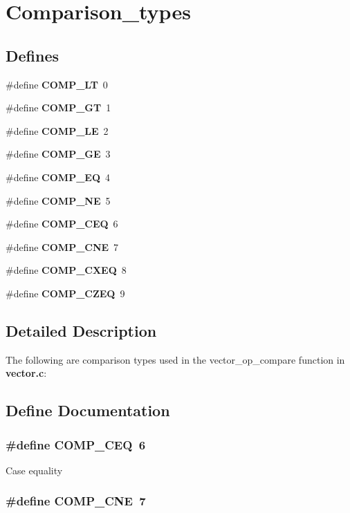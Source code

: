 \section{Comparison\_\-types}
\label{group__comparison__types}
\subsection*{Defines}
\begin{CompactItemize}
\item 
\#define {\bf COMP\_\-LT}\ 0
\item 
\#define {\bf COMP\_\-GT}\ 1
\item 
\#define {\bf COMP\_\-LE}\ 2
\item 
\#define {\bf COMP\_\-GE}\ 3
\item 
\#define {\bf COMP\_\-EQ}\ 4
\item 
\#define {\bf COMP\_\-NE}\ 5
\item 
\#define {\bf COMP\_\-CEQ}\ 6
\item 
\#define {\bf COMP\_\-CNE}\ 7
\item 
\#define {\bf COMP\_\-CXEQ}\ 8
\item 
\#define {\bf COMP\_\-CZEQ}\ 9
\end{CompactItemize}


\subsection{Detailed Description}
The following are comparison types used in the vector\_\-op\_\-compare function in {\bf vector.c}: 

\subsection{Define Documentation}
\subsubsection{\setlength{\rightskip}{0pt plus 5cm}\#define COMP\_\-CEQ\ 6}\label{group__comparison__types_a6}


Case equality 
\subsubsection{\setlength{\rightskip}{0pt plus 5cm}\#define COMP\_\-CNE\ 7}\label{group__comparison__types_a7}


